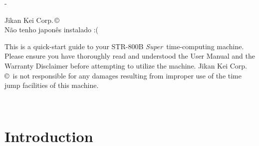 \documentclass[a5paper,onecolumn,final,10pt]{memoir}
\newcommand\machinename%
	{\textsf{STR-800B \textit{Super}}}
\newcommand\companyname%
	{Jikan Kei Corp.\,\copyright}
\begin{document}
\frontmatter

\begin{titlingpage}
\calccentering{\unitlength}
\begin{adjustwidth*}{\unitlength}{-\unitlength}
	\centering
	
	\vspace*{4\baselineskip}
	
	
	\vfill
	
	{\footnotesize \companyname \\ Não tenho japonês instalado :(}
\end{adjustwidth*}
\end{titlingpage}



\thispagestyle{empty}

\begin{footnotesize}
\noindent
This is a quick-start guide to your \machinename\ time-computing machine. 
Please ensure you have thoroughly read and understood the User Manual and the Warranty Disclaimer before attempting to utilize the machine. 
\companyname\ is not responsible for any damages resulting from improper use of the time jump facilities of this machine. 

~

\end{footnotesize}



\clearpage
\renewcommand\cftchapterfont{\ttfamily}
\renewcommand\cftchapterleader{\ttfamily\cftdotfill{.}}  %
\renewcommand\cftchapterpagefont{\ttfamily}
\tableofcontents*



\mainmatter

\section{Introduction}
\end{document}
